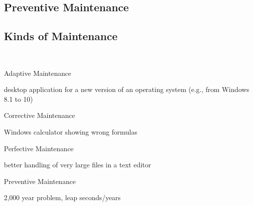 \subsection{Preventive Maintenance}

\subsection{Kinds of Maintenance}
\begin{frame}{\insertsubsection\ \mytitlesource{\ludewiglichter}} %
	\begin{fancycolumns}
		\begin{definition}{Adaptive Maintenance \mysource{\lientzswanson}}
			 \hfill {}
		\end{definition}
		\begin{example}{}
			desktop application for a new version of an operating system (e.g., from Windows 8.1 to 10)
		\end{example}
		\begin{definition}{Corrective Maintenance \mysource{\lientzswanson}}
			 \hfill {}
		\end{definition}
		\begin{example}{}
			Windows calculator showing wrong formulas
		\end{example}
		\nextcolumn
		\begin{definition}{Perfective Maintenance \mysource{\lientzswanson}}
			 \hfill {}
		\end{definition}
		\begin{example}{}
			better handling of very large files in a text editor
		\end{example}
		\begin{definition}{Preventive Maintenance \mysource{\lientzswanson}}
			 \hfill {}
		\end{definition}
		\begin{example}{}
			2,000 year problem, leap seconds/years
		\end{example}
	\end{fancycolumns}
\end{frame}

